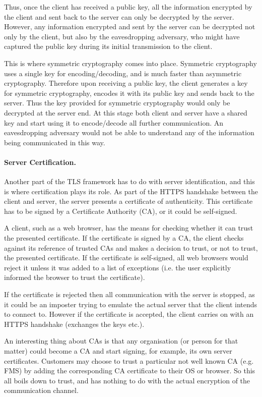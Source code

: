 \documentclass[a4paper,12pt,oneside,openright]{memoir}
\begin{document}
	Thus, once the client has received a public key, all the information encrypted by the client and sent back to the server can only be decrypted by the server.
	However, any information encrypted and sent by the server can be decrypted not only by the client, but also by the eavesdropping adversary, who might have captured the public key during its initial transmission to the client.

	This is where symmetric cryptography comes into place.
	Symmetric cryptography uses a single key for encoding/decoding, and is much faster than asymmetric cryptography.
	Therefore upon receiving a public key, the client generates a key for symmetric cryptography, encodes it with its public key and sends back to the server.
	Thus the key provided for symmetric cryptography would only be decrypted at the server end.
	At this stage both client and server have a shared key and start using it to encode/decode all further communication.
	An eavesdropping adversary would not be able to understand any of the information being communicated in this way.

	\paragraph{Server Certification.}
	Another part of the TLS framework has to do with server identification, and this is where certification plays its role.
	As part of the HTTPS handshake between the client and server, the server presents a certificate of authenticity.
	This certificate has to be signed by a Certificate Authority (CA), or it could be self-signed.

	A client, such as a web browser, has the means for checking whether it can trust the presented certificate.
	If the certificate is signed by a CA, the client checks against its reference of trusted CAs and makes a decision to trust, or not to trust, the presented certificate.
	If the certificate is self-signed, all web browsers would reject it unless it was added to a list of exceptions (i.e. the user explicitly informed the browser to trust the certificate).

	If the certificate is rejected then all communication with the server is stopped, as it could be an imposter trying to emulate the actual server that the client intends to connect to.
	However if the certificate is accepted, the client carries on with an HTTPS handshake (exchanges the keys etc.).

	An interesting thing about CAs is that any organisation (or person for that matter) could become a CA and start signing, for example, its own server certificates.
	Customers may choose to trust a particular not well known CA (e.g. FMS) by adding the corresponding CA certificate to their OS or browser.
	So this all boils down to trust, and has nothing to do with the actual encryption of the communication channel.
\end{document}
